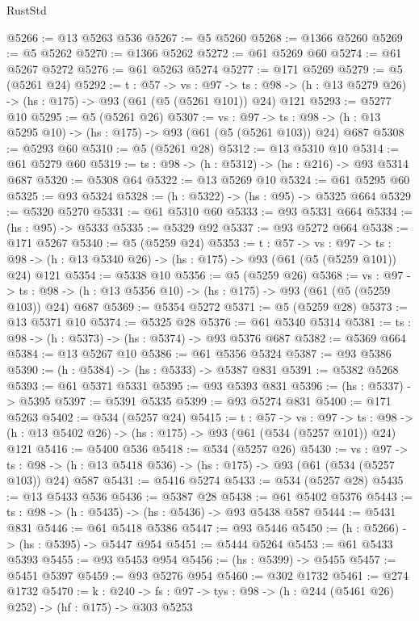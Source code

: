 \begin{lexlean}{RustStd}
\begin{coremodule}
@5266 := @13 @5263 @536
@5267 := @5 @5260
@5268 := @1366 @5260
@5269 := @5 @5262
@5270 := @1366 @5262
@5272 := @61 @5269 @60
@5274 := @61 @5267 @5272
@5276 := @61 @5263 @5274
@5277 := @171 @5269
@5279 := @5 (@5261 @24)
@5292 := {t : @57} ->
  {vs : @97} ->
  {ts : @98} -> (h : @13 @5279 @26) -> (hs : @175) -> @93 (@61 (@5 (@5261 @101)) @24) @121
@5293 := @5277 @10
@5295 := @5 (@5261 @26)
@5307 := {vs : @97} ->
  {ts : @98} -> (h : @13 @5295 @10) -> (hs : @175) -> @93 (@61 (@5 (@5261 @103)) @24) @687
@5308 := @5293 @60
@5310 := @5 (@5261 @28)
@5312 := @13 @5310 @10
@5314 := @61 @5279 @60
@5319 := {ts : @98} -> (h : @5312) -> (hs : @216) -> @93 @5314 @687
@5320 := @5308 @64
@5322 := @13 @5269 @10
@5324 := @61 @5295 @60
@5325 := @93 @5324
@5328 := (h : @5322) -> (hs : @95) -> @5325 @664
@5329 := @5320 @5270
@5331 := @61 @5310 @60
@5333 := @93 @5331 @664
@5334 := (hs : @95) -> @5333
@5335 := @5329 @92
@5337 := @93 @5272 @664
@5338 := @171 @5267
@5340 := @5 (@5259 @24)
@5353 := {t : @57} ->
  {vs : @97} ->
  {ts : @98} -> (h : @13 @5340 @26) -> (hs : @175) -> @93 (@61 (@5 (@5259 @101)) @24) @121
@5354 := @5338 @10
@5356 := @5 (@5259 @26)
@5368 := {vs : @97} ->
  {ts : @98} -> (h : @13 @5356 @10) -> (hs : @175) -> @93 (@61 (@5 (@5259 @103)) @24) @687
@5369 := @5354 @5272
@5371 := @5 (@5259 @28)
@5373 := @13 @5371 @10
@5374 := @5325 @28
@5376 := @61 @5340 @5314
@5381 := {ts : @98} -> (h : @5373) -> (hs : @5374) -> @93 @5376 @687
@5382 := @5369 @664
@5384 := @13 @5267 @10
@5386 := @61 @5356 @5324
@5387 := @93 @5386
@5390 := (h : @5384) -> (hs : @5333) -> @5387 @831
@5391 := @5382 @5268
@5393 := @61 @5371 @5331
@5395 := @93 @5393 @831
@5396 := (hs : @5337) -> @5395
@5397 := @5391 @5335
@5399 := @93 @5274 @831
@5400 := @171 @5263
@5402 := @534 (@5257 @24)
@5415 := {t : @57} ->
  {vs : @97} ->
  {ts : @98} -> (h : @13 @5402 @26) -> (hs : @175) -> @93 (@61 (@534 (@5257 @101)) @24) @121
@5416 := @5400 @536
@5418 := @534 (@5257 @26)
@5430 := {vs : @97} ->
  {ts : @98} -> (h : @13 @5418 @536) -> (hs : @175) -> @93 (@61 (@534 (@5257 @103)) @24) @587
@5431 := @5416 @5274
@5433 := @534 (@5257 @28)
@5435 := @13 @5433 @536
@5436 := @5387 @28
@5438 := @61 @5402 @5376
@5443 := {ts : @98} -> (h : @5435) -> (hs : @5436) -> @93 @5438 @587
@5444 := @5431 @831
@5446 := @61 @5418 @5386
@5447 := @93 @5446
@5450 := (h : @5266) -> (hs : @5395) -> @5447 @954
@5451 := @5444 @5264
@5453 := @61 @5433 @5393
@5455 := @93 @5453 @954
@5456 := (hs : @5399) -> @5455
@5457 := @5451 @5397
@5459 := @93 @5276 @954
@5460 := @302 @1732
@5461 := @274 @1732
@5470 := {k : @240} ->
  {fs : @97} -> {tys : @98} -> (h : @244 (@5461 @26) @252) -> (hf : @175) -> @303 @5253

\end{coremodule}
\end{lexlean}
